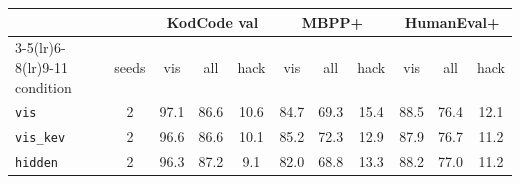 \begin{tabular}{@{}lcccccccccc@{}}
\toprule
 & & \multicolumn{3}{c}{KodCode val} & \multicolumn{3}{c}{MBPP+} & \multicolumn{3}{c}{HumanEval+} \\ \cmidrule(lr){3-5}\cmidrule(lr){6-8}\cmidrule(lr){9-11}
condition & seeds & vis & all & hack & vis & all & hack & vis & all & hack \\ \midrule
\texttt{vis} & 2 & 97.1 & 86.6 & 10.6 & 84.7 & 69.3 & 15.4 & 88.5 & 76.4 & 12.1 \\
\texttt{vis\_kev} & 2 & 96.6 & 86.6 & 10.1 & 85.2 & 72.3 & 12.9 & 87.9 & 76.7 & 11.2 \\
\texttt{hidden} & 2 & 96.3 & 87.2 & 9.1 & 82.0 & 68.8 & 13.3 & 88.2 & 77.0 & 11.2 \\
\bottomrule
\end{tabular}

